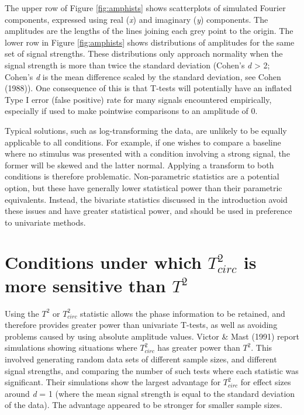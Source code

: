 \documentclass[]{article}
\begin{document}
The upper row of Figure \ref{fig:amphists} shows scatterplots of simulated Fourier components, expressed using real (\emph{x}) and imaginary (\emph{y}) components. The amplitudes are the lengths of the lines joining each grey point to the origin. The lower row in Figure \ref{fig:amphists} shows distributions of amplitudes for the same set of signal strengths. These distributions only approach normality when the signal strength is more than twice the standard deviation (Cohen's \emph{d} \textgreater{} 2; Cohen's \emph{d} is the mean difference scaled by the standard deviation, see Cohen (1988)). One consequence of this is that T-tests will potentially have an inflated Type I error (false positive) rate for many signals encountered empirically, especially if used to make pointwise comparisons to an amplitude of 0.

Typical solutions, such as log-transforming the data, are unlikely to be equally applicable to all conditions. For example, if one wishes to compare a baseline where no stimulus was presented with a condition involving a strong signal, the former will be skewed and the latter normal. Applying a transform to both conditions is therefore problematic. Non-parametric statistics are a potential option, but these have generally lower statistical power than their parametric equivalents. Instead, the bivariate statistics discussed in the introduction avoid these issues and have greater statistical power, and should be used in preference to univariate methods.

\hypertarget{conditions-under-which-t2_circ-is-more-sensitive-than-t2}{%
\section{\texorpdfstring{Conditions under which \(T^2_{circ}\) is more sensitive than \(T^2\)}{Conditions under which T\^{}2\_\{circ\} is more sensitive than T\^{}2}}\label{conditions-under-which-t2_circ-is-more-sensitive-than-t2}}

Using the \(T^2\) or \(T^2_{circ}\) statistic allows the phase information to be retained, and therefore provides greater power than univariate T-tests, as well as avoiding problems caused by using absolute amplitude values. Victor \& Mast (1991) report simulations showing situations where \(T^2_{circ}\) has greater power than \(T^2\). This involved generating random data sets of different sample sizes, and different signal strengths, and comparing the number of such tests where each statistic was significant. Their simulations show the largest advantage for \(T^2_{circ}\) for effect sizes around \emph{d} = 1 (where the mean signal strength is equal to the standard deviation of the data). The advantage appeared to be stronger for smaller sample sizes.
\end{document}
